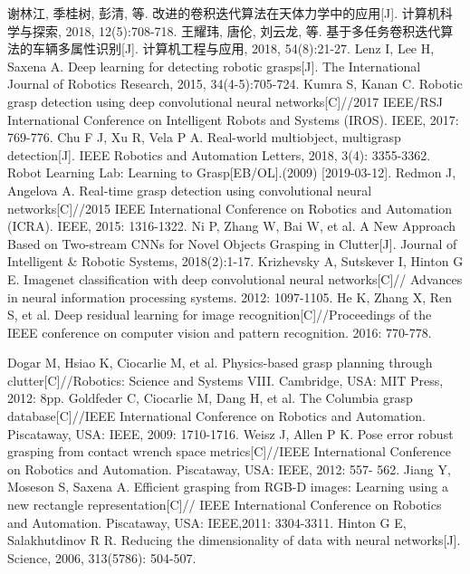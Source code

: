 \documentclass{dmuthesis}
\begin{document}
\begin{thebibliography}{99}
 谢林江, 季桂树, 彭清, 等. 改进的卷积迭代算法在天体力学中的应用[J].  计算机科学与探索,  2018,  12(5):708-718.
王耀玮, 唐伦, 刘云龙, 等. 基于多任务卷积迭代算法的车辆多属性识别[J].  计算机工程与应用, 2018, 54(8):21-27.
 Lenz I, Lee H, Saxena A. Deep learning for detecting robotic grasps[J]. The International Journal of Robotics Research, 2015, 34(4-5):705-724.
 Kumra S, Kanan C. Robotic grasp detection using deep convolutional neural networks[C]//2017 IEEE/RSJ International Conference on Intelligent Robots and Systems (IROS). IEEE, 2017: 769-776.
 Chu F J, Xu R, Vela P A. Real-world multiobject, multigrasp detection[J]. IEEE Robotics and Automation Letters, 2018, 3(4): 3355-3362.
  Robot Learning Lab: Learning to Grasp[EB/OL].(2009) [2019-03-12].
  Redmon J, Angelova A. Real-time grasp detection using convolutional neural networks[C]//2015 IEEE International Conference on Robotics and Automation (ICRA). IEEE, 2015: 1316-1322.
 Ni P, Zhang W, Bai W, et al. A New Approach Based on Two-stream CNNs for Novel Objects Grasping in Clutter[J]. Journal of Intelligent \& Robotic Systems, 2018(2):1-17.
 Krizhevsky A, Sutskever I, Hinton G E. Imagenet classif\/ication with deep convolutional neural networks[C]// Advances in neural information processing systems. 2012: 1097-1105.
 He K, Zhang X, Ren S, et al. Deep residual learning for image recognition[C]//Proceedings of the IEEE conference on computer vision and pattern recognition. 2016: 770-778.

 Dogar M, Hsiao K, Ciocarlie M, et al. Physics-based grasp planning through clutter[C]//Robotics: Science and Systems VIII. Cambridge, USA: MIT Press, 2012: 8pp.
 Goldfeder C, Ciocarlie M, Dang H, et al. The Columbia grasp database[C]//IEEE International Conference on Robotics and Automation. Piscataway, USA: IEEE, 2009: 1710-1716.
 Weisz J, Allen P K. Pose error robust grasping from contact wrench space metrics[C]//IEEE International Conference on Robotics and Automation. Piscataway, USA: IEEE, 2012: 557- 562.
   Jiang Y, Moseson S, Saxena A. Eff\/icient grasping from RGB-D images: Learning using a new rectangle representation[C]// IEEE International Conference on Robotics and Automation. Piscataway, USA: IEEE,2011: 3304-3311.
  Hinton G E, Salakhutdinov R R. Reducing the dimensionality of data with neural networks[J]. Science, 2006, 313(5786): 504-507.


\end{thebibliography}
\end{document}
